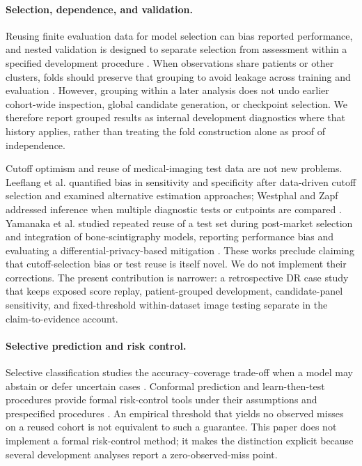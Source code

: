 \documentclass[11pt]{article}
\begin{document}
\paragraph{Selection, dependence, and validation.} Reusing finite evaluation data for model selection can bias reported performance, and nested validation is designed to separate selection from assessment within a specified development procedure \cite{cawley2010,varma2006}. When observations share patients or other clusters, folds should preserve that grouping to avoid leakage across training and evaluation \cite{roberts2017}. However, grouping within a later analysis does not undo earlier cohort-wide inspection, global candidate generation, or checkpoint selection. We therefore report grouped results as internal development diagnostics where that history applies, rather than treating the fold construction alone as proof of independence.

Cutoff optimism and reuse of medical-imaging test data are not new problems. Leeflang et al. quantified bias in sensitivity and specificity after data-driven cutoff selection and examined alternative estimation approaches; Westphal and Zapf addressed inference when multiple diagnostic tests or cutpoints are compared \cite{leeflang2008,westphal2024}. Yamanaka et al. studied repeated reuse of a test set during post-market selection and integration of bone-scintigraphy models, reporting performance bias and evaluating a differential-privacy-based mitigation \cite{yamanaka2026}. These works preclude claiming that cutoff-selection bias or test reuse is itself novel. We do not implement their corrections. The present contribution is narrower: a retrospective DR case study that keeps exposed score replay, patient-grouped development, candidate-panel sensitivity, and fixed-threshold within-dataset image testing separate in the claim-to-evidence account.

\paragraph{Selective prediction and risk control.} Selective classification studies the accuracy--coverage trade-off when a model may abstain or defer uncertain cases \cite{geifman2017,selectivenet}. Conformal prediction and learn-then-test procedures provide formal risk-control tools under their assumptions and prespecified procedures \cite{vovk2005,angelopoulos2021,angelopoulos2024}. An empirical threshold that yields no observed misses on a reused cohort is not equivalent to such a guarantee. This paper does not implement a formal risk-control method; it makes the distinction explicit because several development analyses report a zero-observed-miss point.
\end{document}
